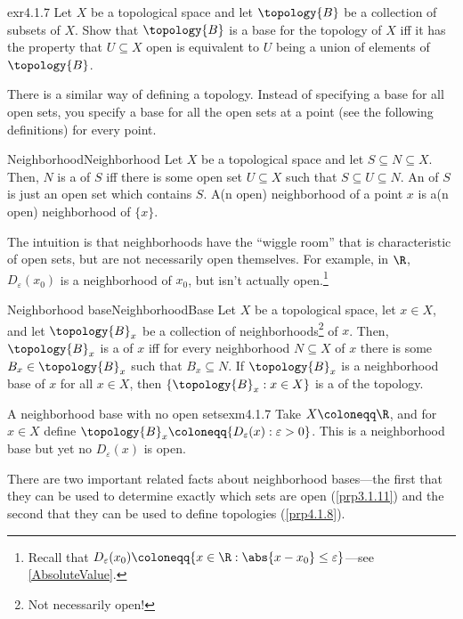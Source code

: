 \begin{exr}{}{exr4.1.7}
Let $X$ be a topological space and let $\topology{B}$ be a collection of subsets of $X$.  Show that $\topology{B}$ is a base for the topology of $X$ iff it has the property that $U\subseteq X$ open is equivalent to $U$ being a union of elements of $\topology{B}$.
\end{exr}
There is a similar way of defining a topology.  Instead of specifying a base for all open sets, you specify a base for all the open sets at a point (see the following definitions) for every point.
\begin{dfn}{Neighborhood}{Neighborhood}
Let $X$ be a topological space and let $S\subseteq N\subseteq X$.  Then, $N$ is a  of $S$ iff there is some open set $U\subseteq X$ such that $S\subseteq U\subseteq N$.  An  of $S$ is just an open set which contains $S$.  A(n open) neighborhood of a point $x$ is a(n open) neighborhood of $\{ x\}$.
\begin{rmk}
The intuition is that neighborhoods have the ``wiggle room'' that is characteristic of open sets, but are not necessarily open themselves.  For example, in $\R$, $D_{\varepsilon}(x_0)$ is a neighborhood of $x_0$, but isn't actually open.\footnote{Recall that $D_{\varepsilon}(x_0)\coloneqq \{ x\in \R :\abs{x-x_0}\leq \varepsilon \}$---see \cref{AbsoluteValue}.}
\end{rmk}
\end{dfn}
\begin{dfn}{Neighborhood base}{NeighborhoodBase}
Let $X$ be a topological space, let $x\in X$, and let $\topology{B}_x$ be a collection of neighborhoods\footnote{Not necessarily open!} of $x$.  Then, $\topology{B}_x$ is a  of $x$ iff for every neighborhood $N\subseteq X$ of $x$ there is some $B_x\in \topology{B}_x$ such that $B_x\subseteq N$.  If $\topology{B}_x$ is a neighborhood base of $x$ for all $x\in X$, then $\{ \topology{B}_x:x\in X\}$ is a  of the topology.
\end{dfn}
\begin{exm}{A neighborhood base with no open sets}{exm4.1.7}
Take $X\coloneqq \R$, and for $x\in X$ define $\topology{B}_x\coloneqq \{ D_{\varepsilon}(x):\varepsilon >0\}$.  This is a neighborhood base but yet no $D_{\varepsilon}(x)$ is open.
\end{exm}
There are two important related facts about neighborhood bases---the first that they can be used to determine exactly which sets are open (\cref{prp3.1.11}) and the second that they can be used to define topologies (\cref{prp4.1.8}).
